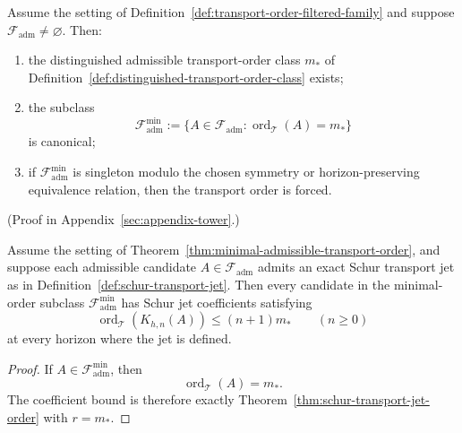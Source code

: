 \begin{theorem}
\label{thm:minimal-admissible-transport-order}
Assume the setting of Definition~\ref{def:transport-order-filtered-family} and
suppose $\mathcal F_{\mathrm{adm}}\neq\varnothing$. Then:
\begin{enumerate}[label=(\roman*), leftmargin=2em, itemsep=0.2em]
\item the distinguished admissible transport-order class $m_\ast$ of
      Definition~\ref{def:distinguished-transport-order-class} exists;
\item the subclass
      \[
      \mathcal F_{\mathrm{adm}}^{\min}
      :=
      \{A\in\mathcal F_{\mathrm{adm}}:\operatorname{ord}_{\mathcal T}(A)=m_\ast\}
      \]
      is canonical;
\item if $\mathcal F_{\mathrm{adm}}^{\min}$ is singleton modulo the chosen
      symmetry or horizon-preserving equivalence relation, then the transport
      order is forced.
\end{enumerate}
\end{theorem}

(Proof in Appendix~\ref{sec:appendix-tower}.)

\begin{corollary}
\label{cor:minimal-transport-order-controls-jet}
Assume the setting of Theorem~\ref{thm:minimal-admissible-transport-order}, and
suppose each admissible candidate $A\in\mathcal F_{\mathrm{adm}}$ admits an
exact Schur transport jet as in Definition~\ref{def:schur-transport-jet}. Then
every candidate in the minimal-order subclass
$\mathcal F_{\mathrm{adm}}^{\min}$ has Schur jet coefficients satisfying
\[
\operatorname{ord}_{\mathcal T}(K_{h,n}(A))\le (n+1)m_\ast
\qquad(n\ge 0)
\]
at every horizon where the jet is defined.
\end{corollary}

\begin{proof}
If $A\in\mathcal F_{\mathrm{adm}}^{\min}$, then
\[
\operatorname{ord}_{\mathcal T}(A)=m_\ast.
\]
The coefficient bound is therefore exactly
Theorem~\ref{thm:schur-transport-jet-order} with $r=m_\ast$.
\end{proof}


